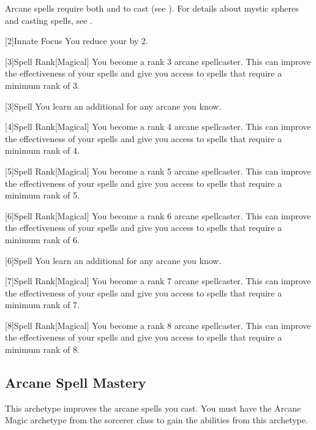         Arcane spells require both  and  to cast (see ).
        For details about mystic spheres and casting spells, see .

        [2]{Innate Focus} You reduce your  by 2.

        [3]{Spell Rank}[Magical] You become a rank 3 arcane spellcaster.
        This can improve the effectiveness of your spells and give you access to spells that require a minimum rank of 3.

        [3]{Spell} You learn an additional  for any arcane  you know.

        [4]{Spell Rank}[Magical] You become a rank 4 arcane spellcaster.
        This can improve the effectiveness of your spells and give you access to spells that require a minimum rank of 4.

        [5]{Spell Rank}[Magical] You become a rank 5 arcane spellcaster.
        This can improve the effectiveness of your spells and give you access to spells that require a minimum rank of 5.

        [6]{Spell Rank}[Magical] You become a rank 6 arcane spellcaster.
        This can improve the effectiveness of your spells and give you access to spells that require a minimum rank of 6.

        [6]{Spell} You learn an additional  for any arcane  you know.

        [7]{Spell Rank}[Magical] You become a rank 7 arcane spellcaster.
        This can improve the effectiveness of your spells and give you access to spells that require a minimum rank of 7.

        [8]{Spell Rank}[Magical] You become a rank 8 arcane spellcaster.
        This can improve the effectiveness of your spells and give you access to spells that require a minimum rank of 8.

    \subsection{Arcane Spell Mastery}
        This archetype improves the arcane spells you cast.
        You must have the Arcane Magic archetype from the sorcerer class to gain the abilities from this archetype.

